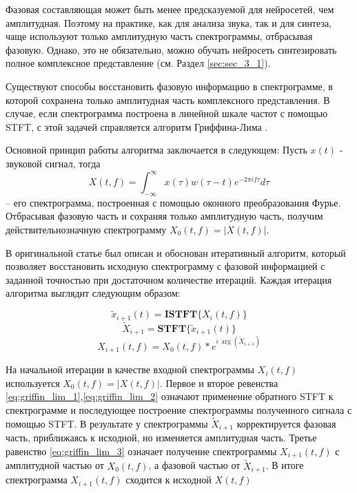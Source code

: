 Фазовая составляющая может быть менее предсказуемой для нейросетей, чем амплитудная.
Поэтому на практике, как для анализа звука, так и для синтеза, чаще используют только амплитудную часть спектрограммы, отбрасывая фазовую.
Однако, это не обязательно, можно обучать нейросеть синтезировать полное комплексное представление (см. Раздел \ref{sec:sec_3_1}).

Существуют способы восстановить фазовую информацию в спектрограмме, в которой сохранена только амплитудная часть комплексного представления.
В случае, если спектрограмма построена в линейной шкале частот с помощью STFT, с этой задачей справляется алгоритм Гриффина-Лима \cite{1164317}.

Основной принцип работы алгоритма заключается в следующем: Пусть $x(t)$ - звуковой сигнал, тогда 
\begin{equation}
X(t, f) = \int_{-\infty}^\infty x(\tau) w(\tau - t) e^{-2\pi i f \tau} d\tau
\end{equation}
 -- его спектрограмма, построенная с помощью оконного преобразования Фурье.
Отбрасывая фазовую часть и сохраняя только амплитудную часть, получим действительнозначную спектрограмму $X_0(t, f) = |X(t, f)|$.

В оригинальной статье \cite{1164317} был описан и обоснован итеративный алгоритм, который позволяет восстановить исходную спектрограмму 
с фазовой информацией с заданной точностью при достаточном количестве итераций. Каждая итерация алгоритма выглядит следующим образом:

\begin{equation}
  \tilde{x}_{i+1}(t) = \textbf{ISTFT}\{X_i(t, f)\}
  \label{eq:griffin_lim_1}
\end{equation}
\begin{equation}
  \tilde{X}_{i+1} = \textbf{STFT}\{\tilde{x}_{i+1}(t)\}
  \label{eq:griffin_lim_2}
\end{equation}
\begin{equation}
  X_{i+1}(t, f) = X_0(t, f) * e^{i\,\arg(\tilde{X}_{i+1})}
  \label{eq:griffin_lim_3}
\end{equation}

На начальной итерации в качестве входной спектрограммы $X_i(t, f)$ используется $X_0(t, f) = |X(t, f)|$. 
Первое и второе ревенства \ref{eq:griffin_lim_1},\ref{eq:griffin_lim_2} означают применение обратного STFT к спектрограмме 
и последующее построение спектрограммы полученного сигнала с помощью STFT. 
В результате у спектрограммы $\tilde{X}_{i+1}$ корректируется фазовая часть, приближаясь к исходной, но изменяется амплитудная часть.
Третье равенство \ref{eq:griffin_lim_3} означает получение спектрограммы $X_{i+1}(t, f)$ с амплитудной частью от $X_0(t, f)$, а фазовой частью от $\tilde{X}_{i+1}$.
В итоге спектрограмма $X_{i+1}(t, f)$ сходится к исходной $X(t, f)$

